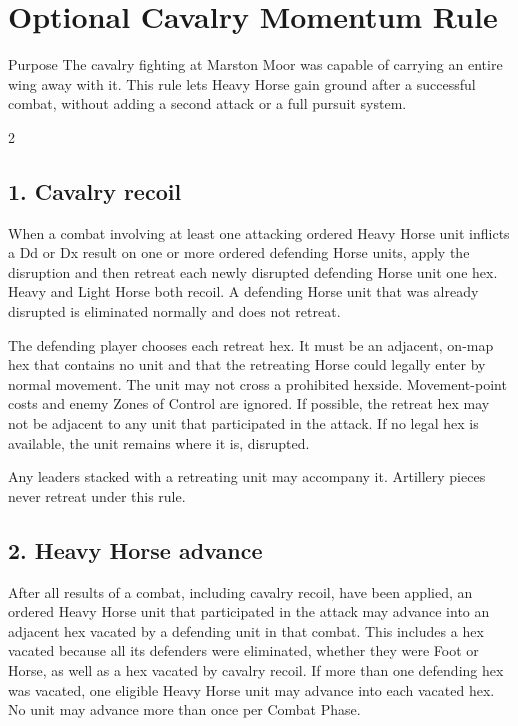 \section{Optional Cavalry Momentum Rule}

\begin{rulebox}{Purpose}
The cavalry fighting at Marston Moor was capable of carrying an entire wing
away with it. This rule lets Heavy Horse gain ground after a successful combat,
without adding a second attack or a full pursuit system.
\end{rulebox}

\begin{multicols}{2}
\subsection{1. Cavalry recoil}

When a combat involving at least one attacking ordered Heavy Horse unit inflicts
a Dd or Dx result on one or more ordered defending Horse units, apply the
disruption and then retreat each newly disrupted defending Horse unit one hex.
Heavy and Light Horse both recoil. A defending Horse unit that was already
disrupted is eliminated normally and does not retreat.

The defending player chooses each retreat hex. It must be an adjacent, on-map
hex that contains no unit and that the retreating Horse could legally enter by
normal movement. The unit may not cross a prohibited hexside. Movement-point
costs and enemy Zones of Control are ignored. If possible, the retreat hex may
not be adjacent to any unit that participated in the attack. If no legal hex is
available, the unit remains where it is, disrupted.

Any leaders stacked with a retreating unit may accompany it. Artillery pieces
never retreat under this rule.

\subsection{2. Heavy Horse advance}

After all results of a combat, including cavalry recoil, have been applied, an
ordered Heavy Horse unit that participated in the attack may advance into an
adjacent hex vacated by a defending unit in that combat. This includes a hex
vacated because all its defenders were eliminated, whether they were Foot or
Horse, as well as a hex vacated by cavalry recoil. If more than one defending
hex was vacated, one eligible Heavy Horse unit may advance into each vacated
hex. No unit may advance more than once per Combat Phase.


\end{multicols}
